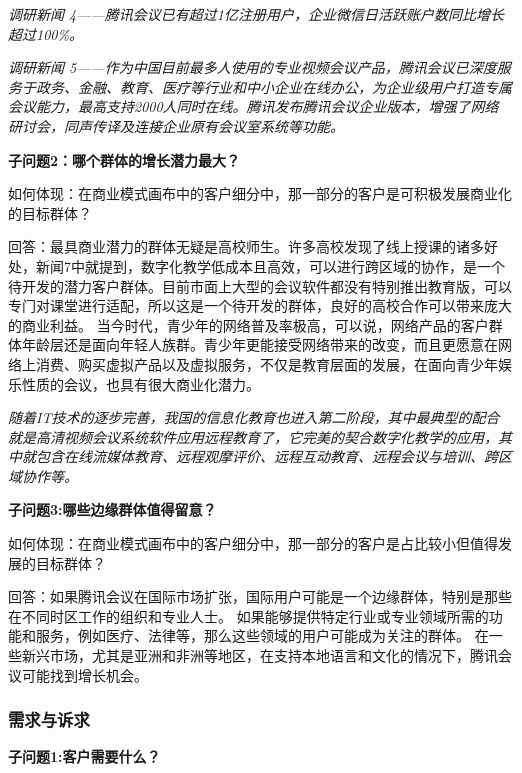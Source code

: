 \documentclass[a4paper,12pt]{article}
\begin{document}
    \textit{调研新闻 4——腾讯会议已有超过1亿注册⽤户，企业微信⽇活跃账户数同⽐增⻓超过100\%。}


    \textit{调研新闻 5——作为中国⽬前最多⼈使⽤的专业视频会议产品，腾讯会议已深度服务于政务、⾦融、教育、医疗等⾏业和中⼩企业在线办公，为企业级⽤户打造专属会议能⼒，最⾼⽀持2000⼈同时在线。腾讯发布腾讯会议企业版本，增强了⽹络研讨会，同声传译及连接企业原有会议室系统等功能。}

    
    \textbf{子问题2：哪个群体的增长潜力最大？}

    如何体现：在商业模式画布中的客户细分中，那⼀部分的客户是可积极发展商业化的⽬标群体？

    回答：最具商业潜⼒的群体⽆疑是⾼校师⽣。许多⾼校发现了线上授课的诸多好处，新闻7中就提到，数字化教学低成本且⾼效，可以进⾏跨区域的协作，是⼀个待开发的潜⼒客户群体。⽬前市⾯上⼤型的会议软件都没有特别推出教育版，可以专⻔对课堂进⾏适配，所以这是⼀个待开发的群体，良好的⾼校合作可以带来庞⼤的商业利益。
    当今时代，青少年的网络普及率极高，可以说，⽹络产品的客户群体年龄层还是⾯向年轻⼈族群。⻘少年更能接受⽹络带来的改变，⽽且更愿意在⽹络上消费、购买虚拟产品以及虚拟服务，不仅是教育层面的发展，在面向青少年娱乐性质的会议，也具有很大商业化潜力。

    \textit{随着IT技术的逐步完善，我国的信息化教育也进⼊第⼆阶段，其中最典型的配合就是⾼清视频会议系统软件应⽤远程教育了，它完美的契合数字化教学的应⽤，其中就包含在线流媒体教育、远程观摩评价、远程互动教育、远程会议与培训、跨区域协作等。}


    \textbf{子问题3:哪些边缘群体值得留意？}

    如何体现：在商业模式画布中的客户细分中，那⼀部分的客户是占比较小但值得发展的⽬标群体？

    回答：如果腾讯会议在国际市场扩张，国际用户可能是一个边缘群体，特别是那些在不同时区工作的组织和专业人士。
    如果能够提供特定行业或专业领域所需的功能和服务，例如医疗、法律等，那么这些领域的用户可能成为关注的群体。
    在一些新兴市场，尤其是亚洲和非洲等地区，在支持本地语言和文化的情况下，腾讯会议可能找到增长机会。
    \subsubsection{需求与诉求}
    \textbf{子问题1:客户需要什么？}
\end{document}
